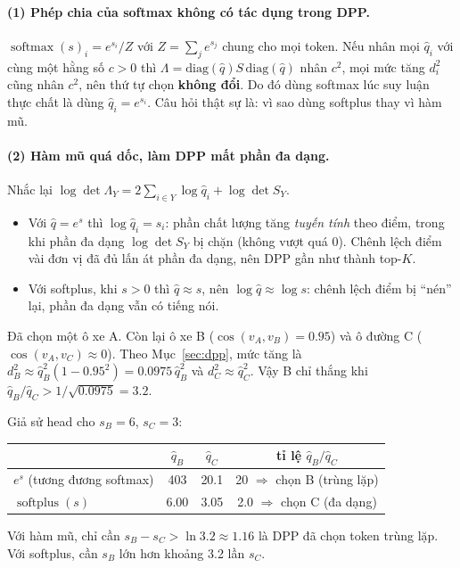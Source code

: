 \documentclass[11pt,a4paper]{article}
\newcommand{\qhat}{\hat{q}}
\newcommand{\softmax}{\operatorname{softmax}}
\newcommand{\softplus}{\operatorname{softplus}}
\begin{document}
\paragraph{(1) Phép chia của softmax không có tác dụng trong DPP.}
$\softmax(s)_i=e^{s_i}/Z$ với $Z=\sum_je^{s_j}$ chung cho mọi token. Nếu nhân mọi $\qhat_i$ với cùng một hằng số $c>0$ thì $\Lambda=\mathrm{diag}(\qhat)S\,\mathrm{diag}(\qhat)$ nhân $c^2$, mọi mức tăng $d_i^2$ cũng nhân $c^2$, nên thứ tự chọn \textbf{không đổi}. Do đó dùng softmax lúc suy luận thực chất là dùng $\qhat_i=e^{s_i}$. Câu hỏi thật sự là: vì sao dùng softplus thay vì hàm mũ.

\paragraph{(2) Hàm mũ quá dốc, làm DPP mất phần đa dạng.}
Nhắc lại $\log\det\Lambda_Y=2\sum_{i\in Y}\log\qhat_i+\log\det S_Y$.
\begin{itemize}[leftmargin=*]
\item Với $\qhat=e^{s}$ thì $\log\qhat_i=s_i$: phần chất lượng tăng \emph{tuyến tính} theo điểm, trong khi phần đa dạng $\log\det S_Y$ bị chặn (không vượt quá 0). Chênh lệch điểm vài đơn vị đã đủ lấn át phần đa dạng, nên DPP gần như thành top-$K$.
\item Với softplus, khi $s>0$ thì $\qhat\approx s$, nên $\log\qhat\approx\log s$: chênh lệch điểm bị ``nén'' lại, phần đa dạng vẫn có tiếng nói.
\end{itemize}

\begin{vidu}
Đã chọn một ô xe A. Còn lại ô xe B ($\cos(v_A,v_B)=0.95$) và ô đường C ($\cos(v_A,v_C)\approx0$). Theo Mục~\ref{sec:dpp}, mức tăng là $d_B^2\approx\qhat_B^2(1-0.95^2)=0.0975\,\qhat_B^2$ và $d_C^2\approx\qhat_C^2$. Vậy B chỉ thắng khi $\qhat_B/\qhat_C>1/\sqrt{0.0975}=3.2$.

Giả sử head cho $s_B=6$, $s_C=3$:
\begin{center}
\begin{tabular}{@{}lccc@{}}
\toprule
& $\qhat_B$ & $\qhat_C$ & tỉ lệ $\qhat_B/\qhat_C$\\
\midrule
$e^{s}$ (tương đương softmax) & 403 & 20.1 & 20 $\Rightarrow$ chọn B (trùng lặp)\\
$\softplus(s)$ & 6.00 & 3.05 & 2.0 $\Rightarrow$ chọn C (đa dạng)\\
\bottomrule
\end{tabular}
\end{center}
Với hàm mũ, chỉ cần $s_B-s_C>\ln3.2\approx1.16$ là DPP đã chọn token trùng lặp. Với softplus, cần $s_B$ lớn hơn khoảng 3.2 lần $s_C$.
\end{vidu}
\end{document}
